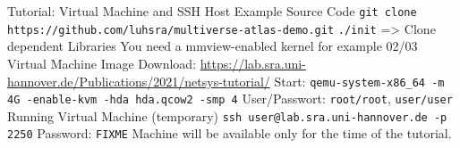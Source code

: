 \begin{frame}{Tutorial: Virtual Machine and SSH Host}
  \bi
  \ii Example Source Code {
    \bi
    \ii \texttt{git clone https://github.com/luhsra/multiverse-atlas-demo.git}
    \ii \texttt{./init} => Clone dependent Libraries
    \ii You need a mmview-enabled kernel for example 02/03
    \ei
  }
  \ii Virtual Machine Image {
    \bi
    \ii Download: \url{https://lab.sra.uni-hannover.de/Publications/2021/netsys-tutorial/}
    \ii Start: \texttt{qemu-system-x86\_64 -m 4G -enable-kvm -hda hda.qcow2 -smp 4}
    \ii User/Passwort: \texttt{root/root}, \texttt{user/user}
    \ei
  }
  \qquad
  \ii Running Virtual Machine (temporary) {
    \bi
    \ii \texttt{ssh user@lab.sra.uni-hannover.de -p 2250}
    \ii Password: \texttt{FIXME}
    \ii Machine will be available only for the time of the tutorial.
    \ei
  }
  \ei
  
\end{frame}
